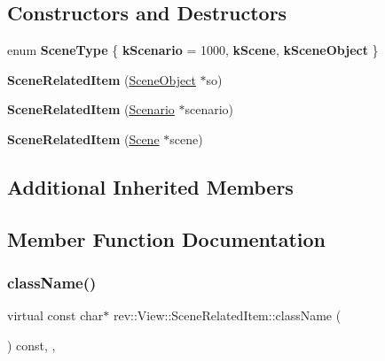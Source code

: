 \subsection*{Constructors and Destructors}
\begin{DoxyCompactItemize}
\item 
\mbox{\label{classrev_1_1_view_1_1_scene_related_item_a462882b7c89ca08dc3c10095866c148c}} 
enum {\bfseries Scene\+Type} \{ {\bfseries k\+Scenario} = 1000, 
{\bfseries k\+Scene}, 
{\bfseries k\+Scene\+Object}
 \}
\item 
\mbox{\label{classrev_1_1_view_1_1_scene_related_item_a9ccfb78a7b4660034c5c8eed52d9403a}} 
{\bfseries Scene\+Related\+Item} (\mbox{\hyperlink{classrev_1_1_scene_object}{Scene\+Object}} $\ast$so)
\item 
\mbox{\label{classrev_1_1_view_1_1_scene_related_item_af961ef3ce4e2831ab343455d929c4e09}} 
{\bfseries Scene\+Related\+Item} (\mbox{\hyperlink{classrev_1_1_scenario}{Scenario}} $\ast$scenario)
\item 
\mbox{\label{classrev_1_1_view_1_1_scene_related_item_a360d1a341673e10dde9bd54055238655}} 
{\bfseries Scene\+Related\+Item} (\mbox{\hyperlink{classrev_1_1_scene}{Scene}} $\ast$scene)
\end{DoxyCompactItemize}
\subsection*{Additional Inherited Members}


\subsection{Member Function Documentation}
\mbox{\label{classrev_1_1_view_1_1_scene_related_item_ae2eff65bbbea3332ccdc41fb85a1f270}} 
\subsubsection{\texorpdfstring{className()}{className()}}
{\footnotesize\ttfamily virtual const char$\ast$ rev\+::\+View\+::\+Scene\+Related\+Item\+::class\+Name (\begin{DoxyParamCaption}{ }\end{DoxyParamCaption}) const\hspace{0.3cm}{\ttfamily [inline]}, {\ttfamily [override]}, {\ttfamily [virtual]}}



